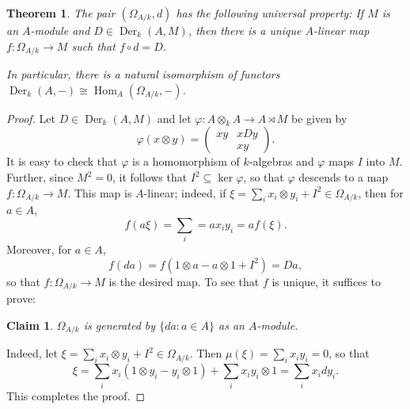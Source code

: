 \documentclass[10pt]{article}
\theoremstyle{thmstyle}
\newtheorem{theorem}{Theorem}[section]
\theoremstyle{defstyle}
\newtheorem*{claim}{Claim}
\newcommand{\Hom}{\operatorname{Hom}}
\newcommand{\Der}{\operatorname{Der}}
\begin{document}
\begin{theorem}
    The pair $(\Omega_{A/k}, d)$ has the following universal property: If $M$ is an $A$-module and $D\in\Der_k(A, M)$, then there is a unique $A$-linear map $f\colon\Omega_{A/k}\to M$ such that $f\circ d = D$.

    In particular, there is a natural isomorphism of functors $\Der_k(A, -)\cong\Hom_A(\Omega_{A/k}, -)$.
\end{theorem}
\begin{proof}
    Let $D\in\Der_k(A, M)$ and let $\varphi\colon A\otimes_k A\to A\rtimes M$ be given by 
    \begin{equation*}
        \varphi(x\otimes y) = 
        \begin{pmatrix}
            xy & xDy\\
            & xy
        \end{pmatrix}.
    \end{equation*}
    It is easy to check that $\varphi$ is a homomorphism of $k$-algebras and $\varphi$ maps $I$ into $M$. Further, since $M^2 = 0$, it follows that $I^2\subseteq\ker\varphi$, so that $\varphi$ descends to a map $f\colon\Omega_{A/k}\to M$. This map is $A$-linear; indeed, if $\xi = \sum_i x_i\otimes y_i + I^2\in\Omega_{A/k}$, then for $a\in A$,
    \begin{equation*}
        f(a\xi) = \sum_{i} = ax_iy_i = af(\xi).
    \end{equation*}
    Moreover, for $a\in A$,
    \begin{equation*}
        f(da) = f(1\otimes a - a\otimes 1 + I^2) = Da,
    \end{equation*}
    so that $f\colon \Omega_{A/k}\to M$ is the desired map. To see that $f$ is unique, it suffices to prove: 
    \begin{claim}
        $\Omega_{A/k}$ is generated by $\{da\colon a\in A\}$ as an $A$-module.
    \end{claim}
    Indeed, let $\xi = \sum_{i} x_i\otimes y_i + I^2\in\Omega_{A/k}$. Then $\mu(\xi) = \sum_i x_iy_i = 0$, so that 
    \begin{equation*}
        \xi = \sum_{i} x_i\left(1\otimes y_i - y_i\otimes 1\right) + \sum_{i} x_iy_i\otimes 1 = \sum_{i} x_i dy_i. 
    \end{equation*}
    This completes the proof.
\end{proof}
\end{document}
